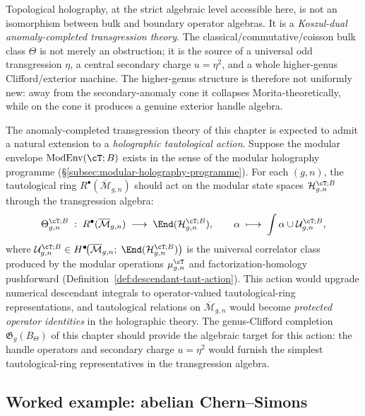 Topological holography, at the strict algebraic level accessible here, is not an isomorphism between bulk and boundary operator algebras.
It is a \emph{Koszul-dual anomaly-completed transgression theory}.
The classical/commutative/coisson bulk class \(\Theta\) is not merely an obstruction; it is the source of a universal odd transgression \(\eta\), a central secondary charge \(u=\eta^{2}\), and a whole higher-genus Clifford/exterior machine.
The higher-genus structure is therefore not uniformly new:
away from the secondary-anomaly cone it collapses Morita-theoretically,
while on the cone it produces a genuine exterior handle algebra.

\providecommand{\ModEnv}{\operatorname{ModEnv}}
\providecommand{\Mbar}{\overline{\mathcal M}}
\providecommand{\Rring}{R^{\bullet}}

\begin{remark}
The anomaly-completed transgression theory of this chapter is expected to admit a
natural extension to a \emph{holographic tautological action}.
Suppose the modular envelope \(\ModEnv(\cT;B)\) exists in the sense of
the modular holography programme
(\S\ref{subsec:modular-holography-programme}).
For each \((g,n)\), the tautological ring
\(\Rring(\Mbar_{g,n})\) should act on the modular state spaces
\(\mathcal{H}_{g,n}^{\cT;B}\) through the transgression algebra:
\[
\Theta_{g,n}^{\cT;B}
\;:\;
\Rring(\Mbar_{g,n})
\;\longrightarrow\;
\End(\mathcal{H}_{g,n}^{\cT;B}),
\qquad
\alpha\;\longmapsto\;
\int\alpha\cup\mathcal{U}_{g,n}^{\cT;B},
\]
where
\(\mathcal{U}_{g,n}^{\cT;B}
\in H^{\bullet}\!\bigl(\Mbar_{g,n};\;\End(\mathcal{H}_{g,n}^{\cT;B})\bigr)\)
is the universal correlator class produced by the modular operations
\(\mu_{g,n}^{\cT}\) and factorization-homology pushforward
(Definition~\ref{def:descendant-taut-action}).
This action would upgrade numerical descendant integrals to operator-valued
tautological-ring representations, and tautological relations on
\(\Mbar_{g,n}\) would become \emph{protected operator identities} in the
holographic theory.
The genus-Clifford completion \(\mathfrak{G}_{g}(B_{\Theta})\) of this
chapter should provide the algebraic target for this action: the handle
operators and secondary charge \(u=\eta^{2}\) would furnish the simplest
tautological-ring representatives in the transgression algebra.
\end{remark}

\subsection{Worked example: abelian Chern--Simons}

